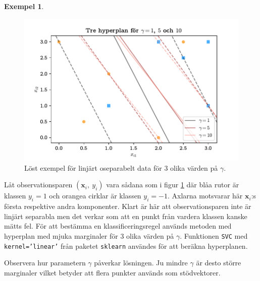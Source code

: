 \documentclass[a4paper, 12pt]{report}
\theoremstyle{definition}
\newtheorem{ex}{Exempel}[section]
\theoremstyle{remark}
\begin{document}
\begin{ex}
\begin{figure}[h]
	\centering
	\includegraphics[width=0.8\linewidth, trim={0.5cm 2mm 0.5cm 6mm}, clip]{KandFigur2.pdf}
	\caption{\label{fig:mjukamarginaler}Löst exempel för linjärt oseparabelt data för 3 olika värden på $\gamma$.}
\end{figure}
Låt observationsparen $\left(\mathbf{x}_i,~y_i\right)$ vara sådana som i figur \ref{fig:mjukamarginaler} där blåa rutor är klassen $y_i=1$ och orangea cirklar är klassen $y_i=-1$. Axlarna motsvarar här $\mathbf{x}_i$:s första respektive andra komponenter. Klart är här att observationsparen inte är linjärt separabla men det verkar som att en punkt från vardera klassen kanske mätts fel. För att bestämma en klassificeringsregel används metoden med hyperplan med mjuka marginaler för 3 olika värden på $\gamma$. Funktionen \texttt{SVC} med \texttt{kernel='linear'} från paketet \texttt{sklearn} \cite{sklearn} användes för att beräkna hyperplanen.

Observera hur parametern $\gamma$ påverkar lösningen. Ju mindre $\gamma$ är desto större marginaler vilket betyder att flera punkter används som stödvektorer.
\end{ex}
\end{document}
